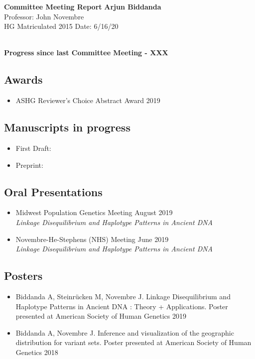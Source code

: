 \documentclass[a4paper, 11pt]{article}
\begin{document}
\noindent
\large\textbf{Committee Meeting Report} \hfill \textbf{Arjun Biddanda} \\
\normalsize  \hfill Professor: John Novembre  \\
HG Matriculated 2015 \hfill Date: 6/16/20 \\
\noindent\makebox[\linewidth]{\rule{\paperwidth}{0.4pt}}

\large\textbf{\\Progress since last Committee Meeting - XXX}
\subsection*{Awards}
\begin{itemize}
    \item ASHG Reviewer's Choice Abstract Award  \hfill 2019 
\end{itemize} 

\subsection*{Manuscripts in progress}
\begin{itemize}
    \item First Draft:  
		\item Preprint: 
\end{itemize}

\subsection*{Oral Presentations}
\begin{itemize}
	\item Midwest Population Genetics Meeting \hfill August 2019 \\ \emph{Linkage Disequilibrium and Haplotype Patterns in Ancient DNA}
	\item Novembre-He-Stephens (NHS) Meeting \hfill June 2019 \\ \emph{Linkage Disequilibrium and Haplotype Patterns in Ancient DNA}   
\end{itemize}

\subsection*{Posters}
\begin{itemize}
	 \item Biddanda A, Steinr\"{u}cken M, Novembre J. Linkage Disequilibrium and Haplotype Patterns in Ancient DNA : Theory + Applications. Poster presented at American Society of Human Genetics 2019
	 \item Biddanda A, Novembre J. Inference and visualization of the geographic distribution for variant sets. Poster presented at American Society of Human Genetics 2018 
\end{itemize}
\end{document}

